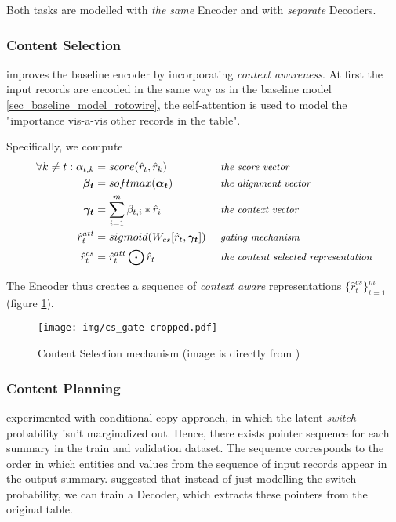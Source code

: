 Both tasks are modelled with \emph{the same} Encoder and with \emph{separate} Decoders.

\subsubsection{Content Selection}

\citep{puduppully2019datatotext} improves the baseline encoder by incorporating \emph{context awareness}. At first the input records are encoded in the same way as in the baseline model \ref{sec_baseline_model_rotowire}, the self-attention is used to model the "importance vis-a-vis other records in the table".

Specifically, we compute
\begin{align*}
\forall k \neq t : \alpha_{t, k} &= score(\hat{r}_t, \hat{r}_k)                         &&\mbox{ \small \emph{the score vector}}\\
\boldsymbol{\beta_t}             &= softmax(\boldsymbol{\alpha_t})                      &&\mbox{ \small \emph{the alignment vector}}\\
\boldsymbol{\gamma_t}            &= \sum_{i=1}^m{\beta_{t, i} * \hat{r}_i}               &&\mbox{ \small \emph{the context vector}}\\
\hat{r}_t^{att}                  &= sigmoid( W_{cs} [\hat{r}_t, \boldsymbol{\gamma_t}] ) &&\mbox{ \small \emph{gating mechanism}}\\
\hat{r}_t^{cs}                   &= \hat{r}_t^{att} \bigodot \hat{r}_t                  &&\mbox{ \small \emph{the content selected representation}}
\end{align*}

The Encoder thus creates a sequence of \emph{context aware} representations $\{\hat{r}_t^{cs}\}_{t=1}^m$ (figure \ref{content_selection_pudupully}).

\begin{figure}[!h]
    \texttt{[image: img/cs\_gate-cropped.pdf]}
    \caption{Content Selection mechanism (image is directly from \citep{puduppully2019datatotext})} \label{content_selection_pudupully}
\end{figure}

\subsubsection{Content Planning} \label{content_planning_subsubsection}

\citep{wiseman2017} experimented with conditional copy approach, in which the latent \emph{switch} probability isn't marginalized out. Hence, there exists pointer sequence for each summary in the train and validation dataset. The sequence corresponds to the order in which entities and values from the sequence of input records appear in the output summary. \citep{puduppully2019datatotext} suggested that instead of just modelling the switch probability, we can train a Decoder, which extracts these pointers from the original table.

